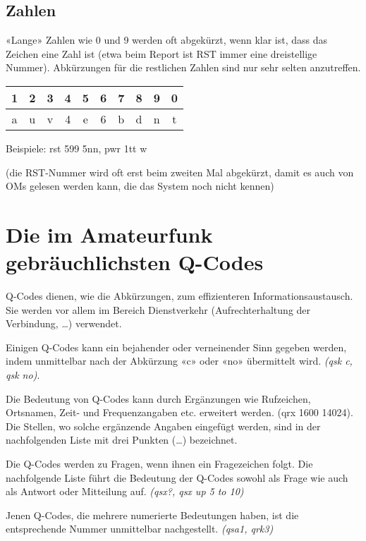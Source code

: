 \subsection{Zahlen}
«Lange» Zahlen wie 0 und 9 werden oft abgekürzt, wenn klar ist, dass das Zeichen eine Zahl ist (etwa beim Report ist RST immer eine dreistellige Nummer). Abkürzungen für die restlichen Zahlen sind nur sehr selten anzutreffen.

\vspace{1em}
{
\begin{tabular}{cccccccccc}
\arrayrulecolor{rowsep}
1 & 2 & 3 & 4 & 5 & 6 & 7 & 8 & 9 & 0 \\
\midrule
a & u & v & 4 & e & 6 & b & d & n & t
\end{tabular}
}
\vspace{1em}

Beispiele: rst 599 5nn, pwr 1tt w

(die RST-Nummer wird oft erst beim zweiten Mal abgekürzt, damit es auch von OMs gelesen werden kann, die das System noch nicht kennen)

\section{Die im Amateurfunk gebräuchlichsten Q-Codes}
Q-Codes dienen, wie die Abkürzungen, zum effizienteren Informationsaustausch. Sie werden vor allem im Bereich Dienstverkehr (Aufrechterhaltung der Verbindung, …) verwendet.

Einigen Q-Codes kann ein bejahender oder verneinender Sinn gegeben werden, indem unmittelbar nach der Abkürzung «c» oder «no» übermittelt wird. \textit{(qsk c, qsk no)}.

Die Bedeutung von Q-Codes kann durch Ergänzungen wie Rufzeichen, Ortsnamen, Zeit- und Frequenzangaben etc. erweitert werden. (qrx 1600 14024). Die Stellen, wo solche ergänzende Angaben eingefügt werden, sind in der nachfolgenden Liste mit drei Punkten (…) bezeichnet. 

Die Q-Codes werden zu Fragen, wenn ihnen ein Fragezeichen folgt. Die nachfolgende Liste führt die Bedeutung der Q-Codes sowohl als Frage wie auch als Antwort oder Mitteilung auf. \textit{(qsx?, qsx up 5 to 10)}

Jenen Q-Codes, die mehrere numerierte Bedeutungen haben, ist die entsprechende Nummer unmittelbar nachgestellt. \textit{(qsa1, qrk3)}

